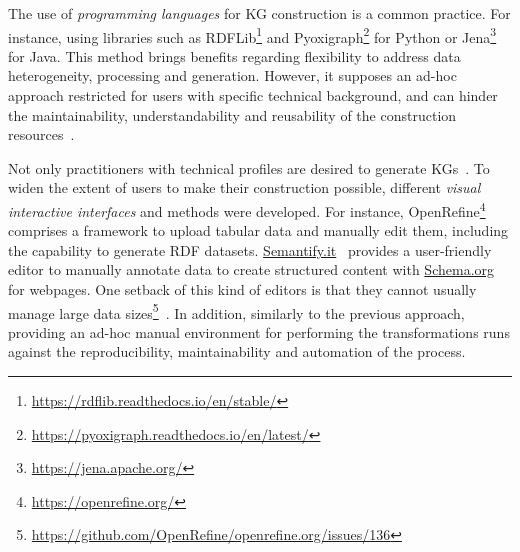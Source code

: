 The use of \textit{programming languages} for KG construction is a common practice. 
For instance, using libraries such as RDFLib\footnote{\url{https://rdflib.readthedocs.io/en/stable/}} and Pyoxigraph\footnote{\url{https://pyoxigraph.readthedocs.io/en/latest/}} for Python or Jena\footnote{\url{https://jena.apache.org/}} for Java. 
This method brings benefits regarding flexibility to address data heterogeneity, processing and generation. 
However, it supposes an ad-hoc approach restricted for users with specific technical background, and can hinder the maintainability, understandability and reusability of the construction resources~\parencite{iglesias2019bio2rdf}.

Not only practitioners with technical profiles are desired to generate KGs~\parencite{karger2014semantic}. 
To widen the extent of users to make their construction possible, different \textit{visual interactive interfaces} and methods were developed. 
For instance, OpenRefine\footnote{\url{https://openrefine.org/}} comprises a framework to upload tabular data and manually edit them, including the capability to generate RDF datasets. \url{Semantify.it}~\parencite{karle2017semantifyit} provides a user-friendly editor to manually annotate data to create structured content with \url{Schema.org}~\parencite{guha2016schema.org} for webpages. 
One setback of this kind of editors is that they cannot usually manage large data sizes\footnote{\url{https://github.com/OpenRefine/openrefine.org/issues/136}}~\parencite{petrova2020data}. 
In addition, similarly to the previous approach, providing an ad-hoc manual environment for performing the transformations runs against the reproducibility, maintainability and automation of the process. 


